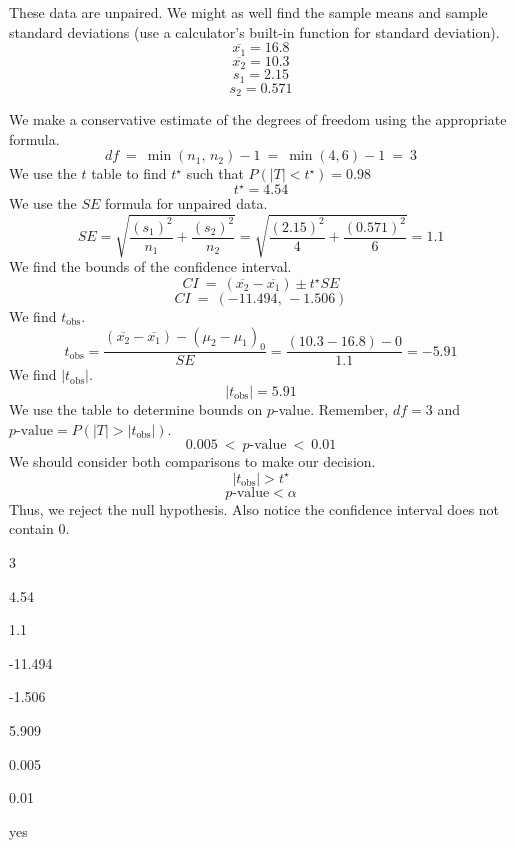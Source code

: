 \begin{solution}
These data are unpaired. We might as well find the sample means and
sample standard deviations (use a calculator's built-in function for
standard deviation). \[\overline{x_1} = 16.8 \]
\[\overline{x_2} = 10.3 \] \[s_1 = 2.15 \] \[s_2 = 0.571 \]

We make a conservative estimate of the degrees of freedom using the
appropriate formula. \[df ~=~ \min(n_1,\,n_2)-1 ~=~ \min(4,6)-1 ~=~ 3 \]
We use the \(t\) table to find \(t^\star\) such that
\(P(|T|<t^\star) = 0.98\) \[t^\star = 4.54 \] We use the \(SE\) formula
for unpaired data.
\[SE = \sqrt{\frac{(s_1)^2}{n_1}+\frac{(s_2)^2}{n_2}} =
\sqrt{\frac{(2.15)^2}{4}+\frac{(0.571)^2}{6}} = 1.1 \] We find the
bounds of the confidence interval.
\[CI ~=~ (\overline{x_2}-\overline{x_1})\pm t^{\star} SE\]
\[CI ~=~ (-11.494,\, -1.506) \] We find \(t_\text{obs}\).
\[t_\text{obs} = \frac{(\overline{x_2}-\overline{x_1})-(\mu_2-\mu_1)_0}{SE} = \frac{(10.3-16.8)-0}{1.1} = -5.91\]
We find \(|t_\text{obs}|\). \[|t_\text{obs}| = 5.91 \] We use the table
to determine bounds on \(p\)-value. Remember, \(df=3\) and
\(p\text{-value} = P(|T|>|t_\text{obs}|)\).
\[0.005 ~<~ p\text{-value} ~<~ 0.01\] We should consider both
comparisons to make our decision. \[|t_\text{obs}| > t^{\star} \]
\[p\text{-value} < \alpha \] Thus, we reject the null hypothesis. Also
notice the confidence interval does not contain 0.
\begin{answerlist}
  \item 3
  \item 4.54
  \item 1.1
  \item -11.494
  \item -1.506
  \item 5.909
  \item 0.005
  \item 0.01
  \item yes
\end{answerlist}
\end{solution}

